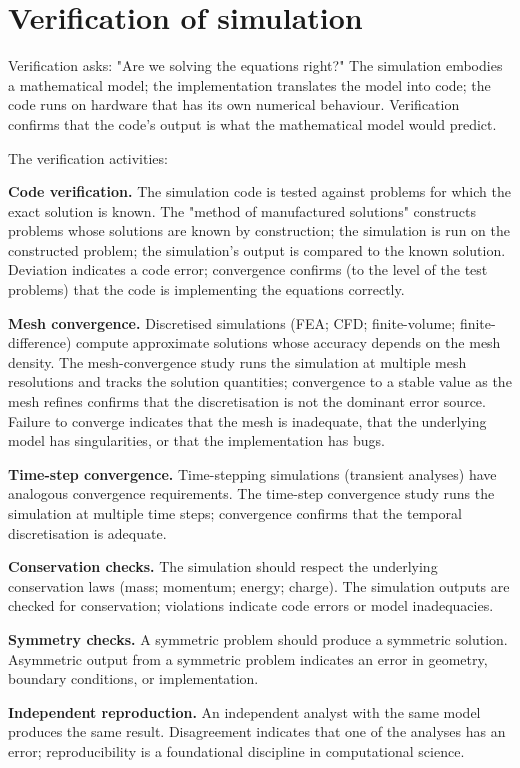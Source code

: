 \section{Verification of simulation}

Verification asks: "Are we solving the equations right?" The simulation embodies a mathematical model; the implementation translates the model into code; the code runs on hardware that has its own numerical behaviour. Verification confirms that the code's output is what the mathematical model would predict.

The verification activities:

\textbf{Code verification.} The simulation code is tested against problems for which the exact solution is known. The "method of manufactured solutions" constructs problems whose solutions are known by construction; the simulation is run on the constructed problem; the simulation's output is compared to the known solution. Deviation indicates a code error; convergence confirms (to the level of the test problems) that the code is implementing the equations correctly.

\textbf{Mesh convergence.} Discretised simulations (FEA; CFD; finite-volume; finite-difference) compute approximate solutions whose accuracy depends on the mesh density. The mesh-convergence study runs the simulation at multiple mesh resolutions and tracks the solution quantities; convergence to a stable value as the mesh refines confirms that the discretisation is not the dominant error source. Failure to converge indicates that the mesh is inadequate, that the underlying model has singularities, or that the implementation has bugs.

\textbf{Time-step convergence.} Time-stepping simulations (transient analyses) have analogous convergence requirements. The time-step convergence study runs the simulation at multiple time steps; convergence confirms that the temporal discretisation is adequate.

\textbf{Conservation checks.} The simulation should respect the underlying conservation laws (mass; momentum; energy; charge). The simulation outputs are checked for conservation; violations indicate code errors or model inadequacies.

\textbf{Symmetry checks.} A symmetric problem should produce a symmetric solution. Asymmetric output from a symmetric problem indicates an error in geometry, boundary conditions, or implementation.

\textbf{Independent reproduction.} An independent analyst with the same model produces the same result. Disagreement indicates that one of the analyses has an error; reproducibility is a foundational discipline in computational science.


